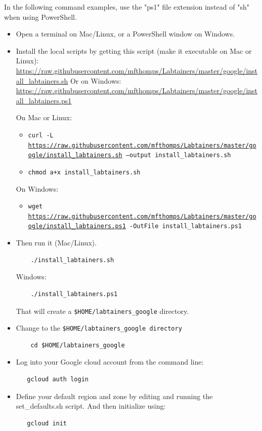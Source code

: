 \documentclass[12pt]{article}
\begin{document}
In the following command examples, use the "ps1" file extension instead of "sh" when using PowerShell.
\begin{itemize}
\item Open a terminal on Mac/Linux, or a PowerShell window on Windows.
\item Install the local scripts by getting this script (make it executable on Mac or Linux):
\url{https://raw.githubusercontent.com/mfthomps/Labtainers/master/google/install\_labtainers.sh}
Or on Windows:
\url{https://raw.githubusercontent.com/mfthomps/Labtainers/master/google/install\_labtainers.ps1}

On Mac or Linux:
\begin{itemize}
\item {\tt curl -L \url{https://raw.githubusercontent.com/mfthomps/Labtainers/master/google/install\_labtainers.sh}  --output install\_labtainers.sh}
\item  {\tt chmod a+x install\_labtainers.sh}
\end{itemize}
\noindent On Windows:
\begin{itemize}
\item {\tt wget \url{https://raw.githubusercontent.com/mfthomps/Labtainers/master/google/install\_labtainers.ps1} -OutFile install\_labtainers.ps1}
\end{itemize}

\item Then run it (Mac/Linux).   
\begin{verbatim}
    ./install_labtainers.sh
\end{verbatim}
\noindent Windows:
\begin{verbatim}
    ./install_labtainers.ps1
\end{verbatim}

\noindent That will create a {\tt \$HOME/labtainers\_google} directory.  

\item Change to the {\tt \$HOME/labtainers\_google directory}
\begin{verbatim}
    cd $HOME/labtainers_google
\end{verbatim}

\item Log into your Google cloud account from the command line:
\begin{verbatim}
   gcloud auth login
\end{verbatim}
\item Define your default region and zone by editing and running the set\_defaults.sh script. And then initialize
using:
\begin{verbatim}
   gcloud init
\end{verbatim}


\end{itemize}
\end{document}
